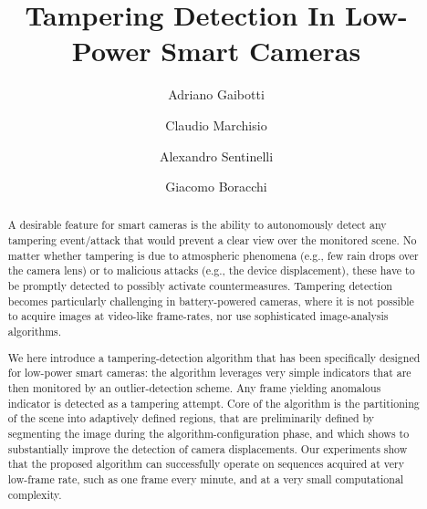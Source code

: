 \documentclass{llncs}
\begin{document}
\title{Tampering Detection In Low-Power Smart Cameras}

\author{Adriano Gaibotti \and Claudio Marchisio \and Alexandro Sentinelli \and Giacomo Boracchi}

\maketitle

\begin{abstract}
A desirable feature for smart cameras is the ability to autonomously detect any tampering event/attack that would prevent a clear view over the monitored scene. No matter whether tampering is due to atmospheric phenomena (e.g., few rain drops over the camera lens) or to malicious attacks (e.g., the device displacement), these have to be promptly detected to possibly activate countermeasures. Tampering detection becomes particularly challenging in battery-powered cameras, where it is not possible to acquire images at video-like frame-rates, nor use sophisticated image-analysis algorithms. 

We here introduce a tampering-detection algorithm that has been specifically designed for low-power smart cameras: the algorithm leverages very simple indicators that are then monitored by an outlier-detection scheme. Any frame yielding anomalous indicator is detected as a tampering attempt. Core of the algorithm is the partitioning of the scene into adaptively defined regions, that are preliminarily defined by segmenting the image during the algorithm-configuration phase, and which shows to substantially improve the detection of camera displacements. Our experiments show that the proposed algorithm can successfully operate on sequences acquired at very low-frame rate, such as one frame every minute, and at a very small computational complexity. %


\end{abstract}
\end{document}
